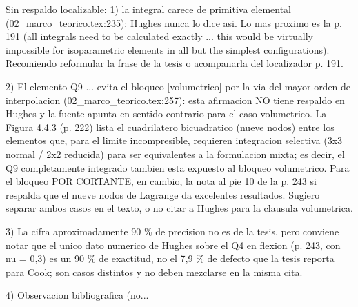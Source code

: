 \documentclass[11pt,a4paper]{article}
\newcommand{\campo}[1]{\textcolor{gris}{\footnotesize #1}}
\begin{document}
{\small\campo{Sin respaldo localizable:} 1) \textquotedbl{}la integral carece de primitiva elemental\textquotedbl{} (02\_marco\_teorico.tex:235): Hughes nunca lo dice asi. Lo mas proximo es la p. 191 (\textquotedbl{}all integrals need to be calculated exactly ... this would be virtually impossible for isoparametric elements in all but the simplest configurations\textquotedbl{}). Recomiendo reformular la frase de la tesis o acompanarla del localizador p. 191.

2) \textquotedbl{}El elemento Q9 ... evita el bloqueo [volumetrico] por la via del mayor orden de interpolacion\textquotedbl{} (02\_marco\_teorico.tex:257): esta afirmacion NO tiene respaldo en Hughes y la fuente apunta en sentido contrario para el caso volumetrico. La Figura 4.4.3 (p. 222) lista el cuadrilatero bicuadratico (nueve nodos) entre los elementos que, para el limite incompresible, requieren integracion selectiva (3x3 normal / 2x2 reducida) para ser equivalentes a la formulacion mixta; es decir, el Q9 completamente integrado tambien esta expuesto al bloqueo volumetrico. Para el bloqueo POR CORTANTE, en cambio, la nota al pie 10 de la p. 243 si respalda que el nueve nodos de Lagrange da excelentes resultados. Sugiero separar ambos casos en el texto, o no citar a Hughes para la clausula volumetrica.

3) La cifra \textquotedbl{}aproximadamente 90 \% de precision\textquotedbl{} no es de la tesis, pero conviene notar que el unico dato numerico de Hughes sobre el Q4 en flexion (p. 243, con nu = 0,3) es un 90 \% de exactitud, no el 7,9 \% de defecto que la tesis reporta para Cook; son casos distintos y no deben mezclarse en la misma cita.

4) Observacion bibliografica (no...\par}
\end{document}
